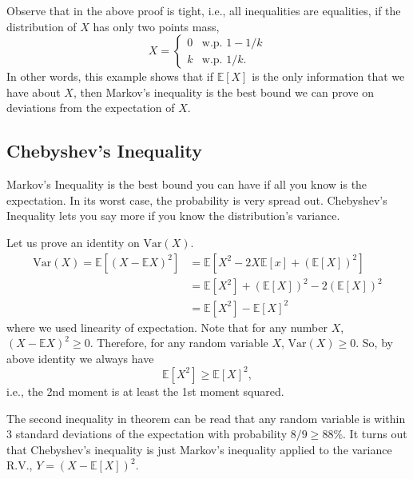 Observe that in the above proof is tight, i.e., all inequalities are equalities, if the distribution of $X$ has only two points mass,
\[
  X = \begin{cases} 0 & \text{w.p. } 1-1/k\\ k & \text{w.p. } 1/k. \end{cases}
\]
In other words, this example shows that if $\mathbb{E}[X]$ is the only information that we have about $X$, then Markov's inequality is the best bound we can prove on deviations from the expectation of $X$.

\subsection{Chebyshev's Inequality}

Markov's Inequality is the best bound you can have if all you know is the expectation. In its worst case, the probability is very spread out. Chebyshev's Inequality lets you say more if you know the distribution's variance.

Let us prove an identity on $\mathrm{Var}(X)$.
\begin{align*}
  \mathrm{Var}(X) = \mathbb{E}\left[(X-\mathbb{E}X)^2\right]
  &= \mathbb{E}\left[X^2 - 2X\mathbb{E}[x] + (\mathbb{E}[X])^2\right]\\
  &= \mathbb{E}\left[X^2\right] + (\mathbb{E}[X])^2 - 2(\mathbb{E}[X])^2\\
  &= \mathbb{E}\left[X^2\right] - \mathbb{E}[X]^2
\end{align*}
where we used linearity of expectation. Note that for any number $X$, $(X-\mathbb{E}X)^2\ge 0$. Therefore, for any random variable $X$, $\mathrm{Var}(X)\ge 0$. So, by above identity we always have
\[
  \mathbb{E}\left[X^2\right] \ge \mathbb{E}[X]^2,
\]
i.e., the 2nd moment is at least the 1st moment squared.


The second inequality in theorem can be read that any random variable is within 3 standard deviations of the expectation with probability $8/9\ge 88\%$. It turns out that Chebyshev's inequality is just Markov's inequality applied to the variance R.V., $Y=(X-\mathbb{E}[X])^2$.

